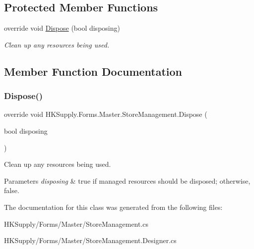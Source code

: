 \subsection*{Protected Member Functions}
\begin{DoxyCompactItemize}
\item 
override void \hyperlink{class_h_k_supply_1_1_forms_1_1_master_1_1_store_management_aaf2bcaa324f2ad626ac66c0d8afe78cb}{Dispose} (bool disposing)
\begin{DoxyCompactList}\small\item\em Clean up any resources being used. \end{DoxyCompactList}\end{DoxyCompactItemize}


\subsection{Member Function Documentation}
\mbox{\label{class_h_k_supply_1_1_forms_1_1_master_1_1_store_management_aaf2bcaa324f2ad626ac66c0d8afe78cb}} 
\subsubsection{\texorpdfstring{Dispose()}{Dispose()}}
{\footnotesize\ttfamily override void H\+K\+Supply.\+Forms.\+Master.\+Store\+Management.\+Dispose (\begin{DoxyParamCaption}\item[{bool}]{disposing }\end{DoxyParamCaption})\hspace{0.3cm}{\ttfamily [protected]}}



Clean up any resources being used. 


\begin{DoxyParams}{Parameters}
{\em disposing} & true if managed resources should be disposed; otherwise, false.\\
\hline
\end{DoxyParams}


The documentation for this class was generated from the following files\+:\begin{DoxyCompactItemize}
\item 
H\+K\+Supply/\+Forms/\+Master/Store\+Management.\+cs\item 
H\+K\+Supply/\+Forms/\+Master/Store\+Management.\+Designer.\+cs\end{DoxyCompactItemize}
